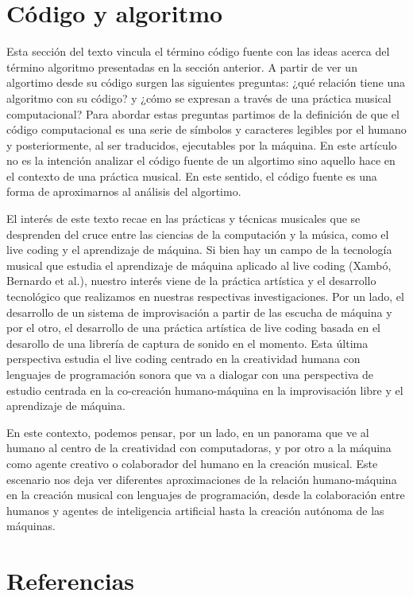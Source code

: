 \section{Código y algoritmo}
Esta sección del texto vincula el término código fuente con las ideas acerca del término algoritmo presentadas en la sección anterior. A partir de ver un algortimo desde su código surgen las siguientes preguntas: ¿qué relación tiene una algoritmo con su código? y ¿cómo se expresan a través de una práctica musical computacional? Para abordar estas preguntas partimos de la definición de que el código computacional es una serie de símbolos y caracteres legibles por el humano y posteriormente, al ser traducidos, ejecutables por la máquina. En este artículo no es la intención analizar el código fuente de un algortimo sino aquello hace en el contexto de una práctica musical. En este sentido, el código fuente es una forma de aproximarnos al análisis del algortimo.

El interés de este texto recae en las prácticas y técnicas musicales que se desprenden del cruce entre las ciencias de la computación y la música, como el live coding y el aprendizaje de máquina. Si bien hay un campo de la tecnología musical que estudia el aprendizaje de máquina aplicado al live coding (Xambó, Bernardo et al.), nuestro interés viene de la práctica artística y el desarrollo tecnológico que realizamos en nuestras respectivas investigaciones. Por un lado, el desarrollo de un sistema de improvisación a partir de las escucha de máquina y por el otro, el desarrollo de una práctica artística de live coding basada en el desarollo de una librería de captura de sonido en el momento. Esta última perspectiva estudia el live coding centrado en la creatividad humana con lenguajes de programación sonora que va a dialogar con una perspectiva de estudio centrada en la co-creación humano-máquina en la improvisación libre y el aprendizaje de máquina.

En este contexto, podemos pensar, por un lado, en un panorama que ve al humano al centro de la creatividad con computadoras, y por otro a la máquina como agente creativo o colaborador del humano en la creación musical. Este escenario nos deja ver diferentes aproximaciones de la relación humano-máquina en la creación musical con lenguajes de programación, desde la colaboración entre humanos y agentes de inteligencia artificial hasta la creación autónoma de las máquinas.


\section{Referencias}

